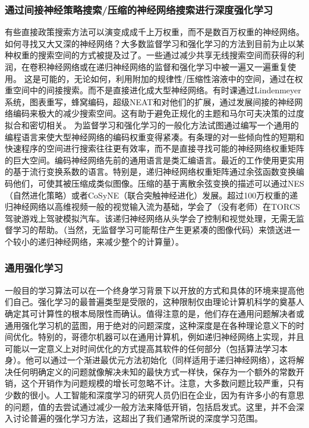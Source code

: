 \documentclass[10pt,journal,compsoc]{IEEEtran}
\begin{document}
\subsubsection{通过间接神经策略搜索/压缩的神经网络搜索进行深度强化学习}
有些直接政策搜索方法可以演变成成千上万权重，而不是数百万权重的神经网络。如何寻找又大又深的神经网络？大多数监督学习和强化学习的方法到目前为止以某种权重的搜索空间的方式被提及过了。一些通过减少共享无线搜索空间而获得的利润，在卷积神经网络或在递归神经网络的监督和强化学习中被一遍又一遍重复使用。
这是可能的，无论如何，利用附加的规律性/压缩性溶液中的空间，通过在权重空间中的间接搜索。而不是直接进化成大型神经网络。有时课通过Lindenmeyer系统，图表重写，蜂窝编码，超级NEAT和对他们的扩展，通过发展间接的神经网络编码来极大的减少搜索空间。这有助于避免正规化的主题和马尔可夫决策的过度拟合和密切相关。
为监督学习和强化学习的一般化方法试图通过编写一个通用的编程语言来使大型神经网络的编码权重变得紧凑。有条理的对一些倾向性的短期和快速程序的空间进行搜索往往更有效率，而不是直接寻找可能的神经网络权重矩阵的巨大空间。编码神经网络先前的通用语言是类汇编语言。最近的工作使用更实用的基于流行变换系数的语言。特别是，递归神经网络权重矩阵通过余弦函数变换编码他们，可使其被压缩成类似图像。压缩的基于离散余弦变换的描述可以通过NES（自然进化策略）或者CoSyNE（联合突触神经进化）发展。超过100万权重的递归神经网络以高维视频一般的视觉输入流为基础，学会了（没有老师）在TORCS驾驶游戏上驾驶模拟汽车。该递归神经网络从头学会了控制和视觉处理，无需无监督学习的帮助。（当然，无监督学习可能帮住产生更紧凑的图像代码）来馈送进一个较小的递归神经网络，来减少整个的计算量）。


\subsubsection{通用强化学习}
一般目的学习算法可以在一个终身学习背景下以开放的方式和具体的环境来提高他们自己。强化学习的最普遍类型是受限的，这种限制仅由理论计算机科学的奠基人确定其可计算性的根本局限性而确认。值得注意的是，他们存在通用问题解决者或通用强化学习机的蓝图，用于绝对的问题深度，这种深度是在各种理论意义下的时间优化。特别的，哥德尔机器可以在通用计算机，例如递归神经网络上实现，并且可能以一定意义上对时间优化的方式提高其软件的任何部分（包括算法学习本身）。他可以通过一个渐进最优元方法初始化（同样适用于递归神经网络），这将解决任何明确定义的问题就像解决未知的最快方式一样快，保存为一个额外的常数开销，这个开销作为问题规模的增长可忽略不计。注意，大多数问题比较严重，只有少数的很小。人工智能和深度学习的研究人员仍旧在企业，因为有许多小的有意思的问题，值的去尝试通过减少一般方法来降低开销，包括启发式。这里，并不会深入讨论普遍的强化学习方法，这超出了我们通常所说的深度学习范围。
\end{document}
